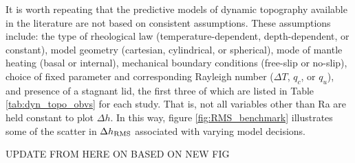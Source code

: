 
It is worth repeating that the predictive models of dynamic topography available in the literature are not based on consistent assumptions. These assumptions include: the type of rheological law (temperature-dependent, depth-dependent, or constant), model geometry (cartesian, cylindrical, or spherical), mode of mantle heating (basal or internal), mechanical boundary conditions (free-slip or no-slip), choice of fixed parameter and corresponding Rayleigh number ($\Delta T$, $q_c$, or $q_u$), and presence of a stagnant lid, the first three of which are listed in Table \ref{tab:dyn_topo_obvs} for each study. That is, not all variables other than Ra are held constant to plot $\Delta h$. In this way, figure \ref{fig:RMS_benchmark} illustrates some of the scatter in $\Delta h_{\rm RMS}$ associated with varying model decisions.


{\color{red} UPDATE FROM HERE ON BASED ON NEW FIG}


